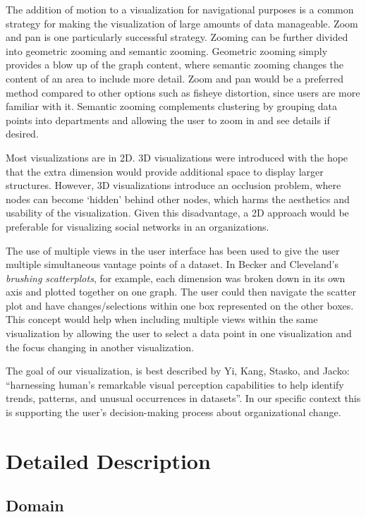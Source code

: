 \documentclass[12pt,letterpaper]{article}
\begin{document}
The addition of motion to a visualization for navigational purposes is a common strategy for making the visualization of large amounts of data manageable. Zoom and pan is one particularly successful strategy. Zooming can be further divided into geometric zooming and semantic zooming.  Geometric zooming simply provides a blow up of the graph content, where semantic zooming changes the content of an area to include more detail\cite{herman2000graph}. Zoom and pan would be a preferred method compared to other options such as fisheye distortion, since users are more familiar with it. Semantic zooming complements clustering by grouping data points into departments and allowing the user to zoom in and see details if desired.

Most visualizations are in 2D. 3D visualizations were introduced with the hope that the extra dimension would provide additional space to display larger structures\cite{herman2000graph}. However, 3D visualizations introduce an occlusion problem, where nodes can become \lq hidden\rq{} behind other nodes, which harms the aesthetics and usability of the visualization\cite{herman2000graph}. Given this disadvantage, a 2D approach would be preferable for visualizing social networks in an organizations.

The use of multiple views in the user interface has been used to give the user multiple simultaneous vantage points of a dataset. In Becker and Cleveland's \emph{brushing scatterplots}\cite{becker1987brushing}, for example, each dimension was broken down in its own axis and plotted together on one graph.  The user could then navigate the scatter plot and have changes/selections within one box represented on the other boxes.  This concept would help when including multiple views within the same visualization by allowing the user to select a data point in one visualization and the focus changing in another visualization.

The goal of our visualization, is best described by Yi, Kang, Stasko, and Jacko: ``harnessing human’s remarkable visual perception capabilities to help identify trends, patterns, and unusual occurrences in datasets''\cite{yi2007toward}.  In our specific context this is supporting the user’s decision-making process about organizational change. 

\section{Detailed Description}

\subsection{Domain}
\end{document}
